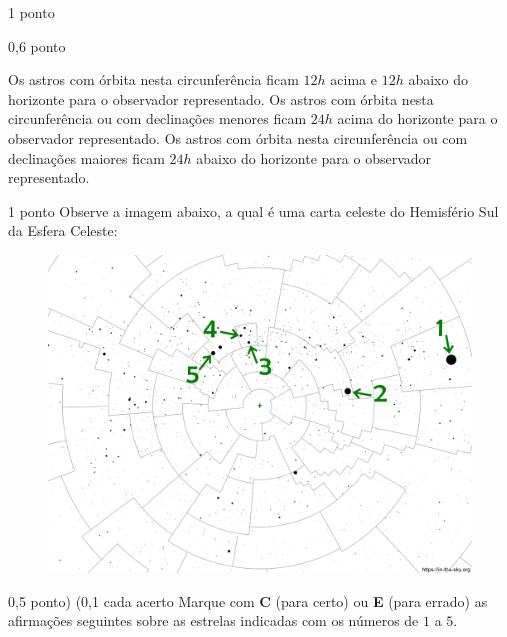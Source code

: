 \documentclass{../lista}
\begin{document}
\begin{questao}{1 ponto}
\begin{pergunta}{0,6 ponto}
			\begin{alternativas}
				\alternativaMarcada[$\red{b}$] Os astros com órbita nesta circunferência ficam $12h$ acima e $12h$ abaixo do horizonte para o observador representado.
				\alternativaMarcada[$\red{a}$] Os astros com órbita nesta circunferência ou com declinações menores ficam $24h$ acima do horizonte para o observador representado.
				\alternativaMarcada[$\red{c}$] Os astros com órbita nesta circunferência ou com declinações maiores ficam $24h$ abaixo do horizonte para o observador representado.
			\end{alternativas}
		\end{pergunta}
	\end{questao}

	\begin{questao}{1 ponto}
		Observe a imagem abaixo, a qual é uma carta celeste do Hemisfério Sul da Esfera Celeste:
		\begin{figure}[H]
			\centering
			\includegraphics[scale=0.5]{./img/2.png}
		\end{figure}

		\begin{pergunta}{0,5 ponto) (0,1 cada acerto}
			Marque com \textbf{C} (para certo) ou \textbf{E} (para errado) as afirmações seguintes sobre as estrelas indicadas com os números de $1$ a $5$.


\end{pergunta}
\end{questao}
\end{document}
